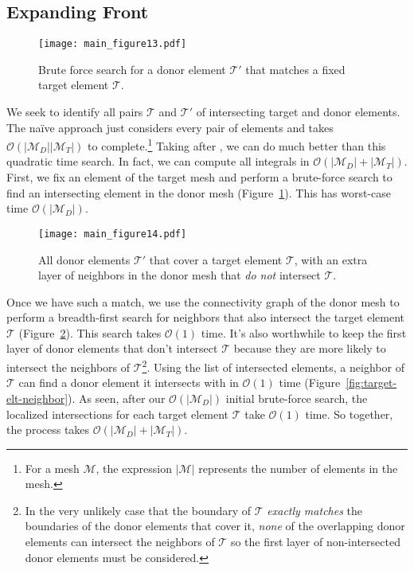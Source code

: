\documentclass[letterpaper,10pt]{article}
\theoremstyle{definition}
\newcommand{\bigO}[1]{\mathcal{O}\left(#1\right)}
\begin{document}
\subsection{Expanding Front}\label{subsec:expanding-front}

\begin{figure}
  \texttt{[image: main\_figure13.pdf]}
  \centering
  \captionsetup{width=.75\linewidth}
  \caption{Brute force search for a donor element \(\mathcal{T}'\) that matches
    a fixed target element \(\mathcal{T}\).}
  \label{fig:target-elt-brute-force}
\end{figure}

We seek to identify all pairs \(\mathcal{T}\) and \(\mathcal{T}'\) of
intersecting target and donor elements. The na\"{i}ve approach just
considers every pair
of elements and takes \(\bigO{\left|\mathcal{M}_D\right|
\left|\mathcal{M}_T\right|}\) to complete.\footnote{For a mesh \(\mathcal{M}\),
the expression \(\left|\mathcal{M}\right|\) represents the number of elements
in the mesh.} Taking after \cite{Farrell2011}, we can do much better than this
quadratic time search. In fact, we can compute all integrals in
\(\bigO{\left|\mathcal{M}_D\right| + \left|\mathcal{M}_T\right|}\).
First, we fix an element of the target mesh and perform a brute-force search
to find an intersecting element in the donor mesh
(Figure~\ref{fig:target-elt-brute-force}). This has worst-case time
\(\bigO{\left|\mathcal{M}_D\right|}\).

\begin{figure}
  \texttt{[image: main\_figure14.pdf]}
  \centering
  \captionsetup{width=.75\linewidth}
  \caption{All donor elements \(\mathcal{T}'\) that cover a target element
    \(\mathcal{T}\), with an extra layer of neighbors in the donor mesh
    that \emph{do not} intersect \(\mathcal{T}\).}
  \label{fig:target-elt-overlap-extra-layer}
\end{figure}

Once we have such a match, we use the connectivity graph of the
donor mesh to perform a breadth-first search
for neighbors that also intersect the target
element \(\mathcal{T}\) (Figure~\ref{fig:target-elt-overlap-extra-layer}).
This search takes \(\bigO{1}\) time. It's also worthwhile to keep the first
layer of donor elements that don't intersect \(\mathcal{T}\) because they are
more likely to intersect the neighbors of \(\mathcal{T}\)\footnote{In the
very unlikely case that the boundary of \(\mathcal{T}\)
\emph{exactly matches} the boundaries of the donor elements that cover it,
\emph{none} of the overlapping donor elements can intersect the neighbors of
\(\mathcal{T}\) so the first layer of non-intersected donor
elements must be considered.}. Using the list of intersected elements, a
neighbor of \(\mathcal{T}\) can find a donor element it intersects with in
\(\bigO{1}\) time (Figure~\ref{fig:target-elt-neighbor}).
As seen, after our \(\bigO{\left|\mathcal{M}_D\right|}\)
initial brute-force search, the localized intersections for each
target element \(\mathcal{T}\) take
\(\bigO{1}\) time. So together, the process takes
\(\bigO{\left|\mathcal{M}_D\right| + \left|\mathcal{M}_T\right|}\).
\end{document}
